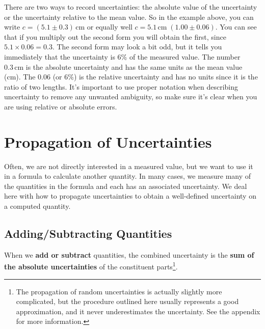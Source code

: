 \documentclass[letterpaper, 12pt]{book}
\begin{document}
There are two ways to record uncertainties: the absolute value of the uncertainty or the uncertainty relative to the mean value. So in the example above, you can write $c = (5.1 \pm 0.3)\,\mathrm{cm}$ or equally well $c = 5.1\,\mathrm{cm}\; (1.00 \pm 0.06)$. You can see that if you multiply out the second form you will obtain the first, since $5.1 \times 0.06 = 0.3$. The second form may look a bit odd, but it tells you immediately that the uncertainty is 6\% of the measured value. The number $0.3\,\mathrm{cm}$ is the absolute uncertainty and has the same units as the mean value (cm). The 0.06 (or 6\%) is the relative uncertainty and has no units since it is the ratio of two lengths. It's important to use proper notation when describing uncertainty to remove any unwanted ambiguity, so make sure it's clear when you are using relative or absolute errors.

\section{Propagation of Uncertainties}

Often, we are not directly interested in a measured value, but we want to use it in a formula to calculate another quantity. In many cases, we measure many of the quantities in the formula and each has an associated uncertainty. We deal here with how to propagate uncertainties to obtain a well-defined uncertainty on a computed quantity.

\subsection{Adding/Subtracting Quantities}

When we \textbf{add or subtract} quantities, the combined uncertainty is the \textbf{sum of the absolute uncertainties} of the constituent parts\footnote{The propagation of random uncertainties is actually slightly more complicated, but the procedure outlined here usually represents a good approximation, and it never underestimates the uncertainty. See the appendix for more information.}.
\end{document}
